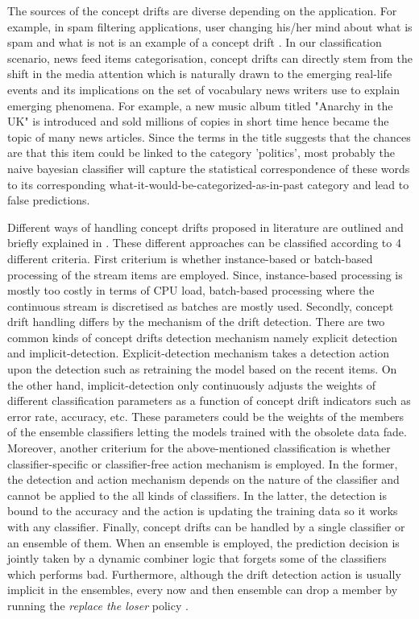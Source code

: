 \documentclass{article} %
\begin{document}
The sources of the concept drifts are diverse depending on the application. For example, in spam filtering applications, user changing his/her mind about what is spam and what is not is an example of a concept drift \cite[p.8]{Gama2014}. In our classification scenario, news feed items categorisation, concept drifts can directly stem from the shift in the media attention which is naturally drawn to the emerging real-life events and its implications on the set of vocabulary news writers use to explain emerging phenomena. For example, a new music album titled  "Anarchy in the UK"  is introduced and sold millions of copies in short time hence became the topic of many news articles. Since the terms in the title suggests that the chances are that this item could be linked to the category 'politics', most probably the naive bayesian classifier will capture the statistical correspondence of these words to its corresponding what-it-would-be-categorized-as-in-past category and lead to false predictions.

Different ways of handling concept drifts proposed in literature are outlined and briefly explained in \cite[p. 1]{KunchevaEnsembleOverview08}. These different approaches can be classified according to 4 different criteria. First criterium is whether instance-based or batch-based processing of the stream items are employed. Since, instance-based processing is mostly too costly in terms of CPU load, batch-based processing where the continuous stream is discretised as batches are mostly used. Secondly, concept drift handling differs by the mechanism of the drift detection. There are two common kinds of concept drifts detection mechanism namely explicit detection and implicit-detection. Explicit-detection mechanism takes a detection action upon the detection such as retraining the model based on the recent items. On the other hand, implicit-detection only continuously adjusts the weights of different classification parameters as a function of concept drift indicators such as error rate, accuracy, etc. These parameters could be the weights of the members of the ensemble classifiers letting the models trained with the obsolete data fade. Moreover, another criterium for the above-mentioned classification is whether classifier-specific or classifier-free action mechanism is employed. In the former, the detection and action mechanism depends on the nature of the classifier and cannot be applied to the all kinds of classifiers. In the latter, the detection is bound to the accuracy and the action is updating the training data so it works with any classifier. Finally, concept drifts can be handled by a single classifier or an ensemble of them. When an ensemble is employed, the prediction decision is jointly taken by a dynamic combiner logic that forgets some of the classifiers which performs bad. Furthermore, although the drift detection action is usually implicit in the ensembles, every now and then ensemble can drop a member by running the \textit{replace the loser} policy \cite[p 18]{kolter}.
\end{document}
